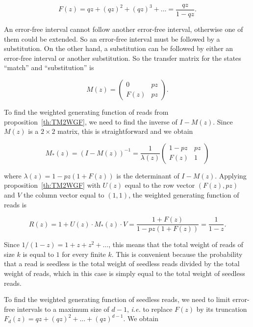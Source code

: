 \documentclass{article}
\begin{document}
\begin{equation}
\label{eq:Fsub}
F(z) = qz + (qz)^2 + (qz)^3 + \ldots = \frac{qz}{1-qz}.
\end{equation}

An error-free interval cannot follow another error-free interval,
otherwise one of them could be extended. So an error-free interval must be
followed by a substitution. On the other hand, a substitution can be
followed by either an error-free interval or another substitution. So the
transfer matrix for the states ``match'' and ``substitution'' is

\begin{equation*}
M(z) = \left(
\begin{matrix}
0    & pz \\
F(z) & pz
\end{matrix}
\right).
\end{equation*}

To find the weighted generating function of reads from
proposition~\ref{th:TM2WGF}, we need to find the inverse of $I-M(z)$.
Since $M(z)$ is a $2 \times 2$ matrix, this is straightforward and we
obtain

\begin{equation*}
M_*(z) = (I-M(z))^{-1}=
\frac{1}{\lambda(z)}
\left(
\begin{matrix}
1-pz & pz   \\
F(z) & 1
\end{matrix}
\right)
\end{equation*}

\noindent
where $\lambda(z) = 1-pz(1+F(z))$ is the determinant of $I-M(z)$. Applying
proposition~\ref{th:TM2WGF} with $U(z)$ equal to the row vector $(F(z),
pz)$ and $V$ the column vector equal to $(1,1)$, the weighted generating
function of reads is

\begin{equation}
\label{eq:Ssub}
R(z) = 1 + U(z) \cdot M_*(z) \cdot V = 
\frac{1+F(z)}{1-pz(1+F(z))} = \frac{1}{1-z}.
\end{equation}

Since $1/(1-z) = 1+z+z^2 + \ldots$, this means that the total weight of
reads of size $k$ is equal to $1$ for every finite $k$. This is convenient
because the probability that a read is seedless is the total weight of
seedless reads divided by the total weight of reads, which in this case is
simply equal to the total weight of seedless reads.

To find the weighted generating function of seedless reads, we need to
limit error-free intervals to a maximum size of $d-1$, \textit{i.e.} to
replace $F(z)$ by its truncation $F_d(z) = qz + (qz)^2 + \ldots
+ (qz)^{d-1}$. We obtain
\end{document}
